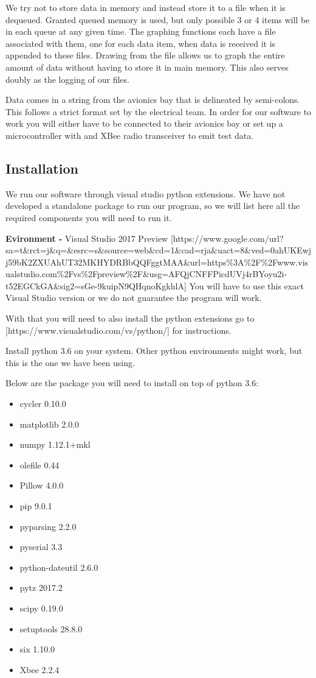 \documentclass[10pt,draftclsnofoot,onecolumn,retainorgcmds]{IEEEtran}
\begin{document}
We try not to store data in memory and instead store it to a file when it is dequeued. Granted queued memory is used, but only possible 3 or 4 items will be in each queue at any given time. The graphing functions each have a file associated with them, one for each data item, when data is received it is appended to these files. Drawing from the file allows us to graph the entire amount of data without having to store it in main memory. This also serves doubly as the logging of our files. \par
Data comes in a string from the avionics bay that is delineated by semi-colons. This follows a strict format set by the electrical team. In order for our software to work you will either have to be connected to their avionics bay or set up a microcontroller with and XBee radio transceiver to emit test data. \par

\subsection{Installation}
We run our software through visual studio python extensions. We have not developed a standalone package to run our program, so we will list here all the required components you will need to run it. \par
{\bf Evironment -} Visual Studio 2017 Preview [https://www.google.com/url?sa=t\&rct=j\&q=\&esrc=s\&source=web\&cd=1\&cad=rja\&uact=8\&ved=0ahUKEwjj59bK2ZXUAhUT32MKHYDRBbQQFggtMAA\&url=https\%3A\%2F\%2Fwww.visualstudio.com\%2Fvs\%2Fpreview\%2F\&usg=AFQjCNFFPicdUVj4rBYoyu2i-t52EGCkGA\&sig2=sGe-9kuipN9QHqnoKgkhlA] You will have to use this exact Visual Studio version or we do not guarantee the program will work. \par
With that you will need to also install the python extensions go to [https://www.visualstudio.com/vs/python/] for instructions. \par
Install python 3.6 on your system. Other python environments might work, but this is the one we have been using. \par
Below are the package you will need to install on top of python 3.6: \par
\begin{itemize}
	\item cycler 0.10.0
	\item matplotlib 2.0.0
	\item numpy 1.12.1+mkl
	\item olefile 0.44
	\item Pillow 4.0.0
	\item pip 9.0.1
	\item pyparsing 2.2.0
	\item pyserial 3.3
	\item python-dateutil 2.6.0
	\item pytz 2017.2
	\item scipy 0.19.0
	\item setuptools 28.8.0
	\item six 1.10.0
	\item Xbee 2.2.4
\end{itemize}
\end{document}
